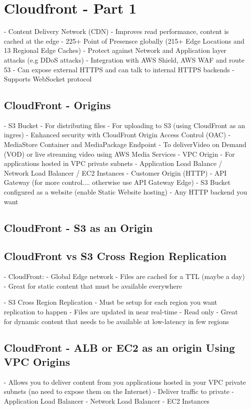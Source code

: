 \documentclass[11pt]{book}
\begin{document}
    \section{Cloudfront - Part 1}
    - Content Delivery Network (CDN)
    - Improves read performance, content is cached at the edge
    - 225+ Point of Presensce globally (215+ Edge Locations and 13 Regional Edge Caches)
    - Protect against Network and Application layer attacks (e.g DDoS attacks)
    - Integration with AWS Shield, AWS WAF and route 53
    - Can expose external HTTPS and can talk to internal HTTPS backends
    - Supports WebSocket protocol

    \subsection{CloudFront - Origins}
    - S3 Bucket
    - For distributing files
    - For uploading to S3 (using CloudFront as an ingres)
    - Enhanced security with CloudFront Origin Access Control (OAC)
    - MediaStore Container and MediaPackage Endpoint
    - To deliverVideo on Demand (VOD) or live streaming video using AWS Media Services
    - VPC Origin
    - For applications hosted in VPC private subnets
    - Application Load Balance / Network Load Balancer / EC2 Instances
    - Customer Origin (HTTP)
    - API Gateway (for more control.... otherwise use API Gateway Edge)
    - S3 Bucket configured as a website (enable Static Website hosting)
    - Any HTTP backend you want

    \subsection{CloudFront - S3 as an Origin}

    \subsection{CloudFront vs S3 Cross Region Replication}
    - CloudFront:
    - Global Edge network
    - Files are cached for a TTL (maybe a day)
    - Great for static content that must be available everywhere

    - S3 Cross Region Replication
    - Must be setup for each region you want replication to happen
    - Files are updated in near real-time
    - Read only
    - Great for dynamic content that needs to be available at low-latency in few regions

    \subsection{CloudFront - ALB or EC2 as an origin Using VPC Origins}
    - Allows you to deliver content from you applications hosted in your VPC private subnets (no need to expose them on the Internet)
    - Deliver traffic to private
    - Application Load Balancer
    - Network Load Balancer
    - EC2 Instances
\end{document}
